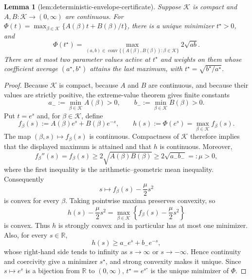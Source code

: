 \documentclass{article}
\newtheorem{lemma}{Lemma}
\begin{document}
\begin{lemma}[lem:deterministic-envelope-certificate]\label{lem:deterministic-envelope-certificate}
Suppose \(\mathcal K\) is compact and \(A,B:\mathcal K\to(0,\infty)\) are continuous.  For \(\Phi(t)=\max_{\beta\in\mathcal K}\{A(\beta)t+B(\beta)/t\}\), there is a unique minimizer \(t^{\star}>0\), and
\[
 \Phi(t^{\star})
 =\max_{(a,b)\in\operatorname{conv}\{(A(\beta),B(\beta)):\beta\in\mathcal K\}}2\sqrt{ab}.
\]
There are at most two parameter values active at \(t^{\star}\) and weights on them whose coefficient average \((a^{\star},b^{\star})\) attains the last maximum, with \(t^{\star}=\sqrt{b^{\star}/a^{\star}}\).
\end{lemma}
\begin{proof}
Because \(\mathcal K\) is compact, because \(A\) and \(B\) are continuous, and because their values are strictly positive, the extreme-value theorem gives finite constants
\[
 a_-:=\min_{\beta\in\mathcal K}A(\beta)>0,
 \qquad
 b_-:=\min_{\beta\in\mathcal K}B(\beta)>0.
\]
Put \(t=e^s\) and, for \(\beta\in\mathcal K\), define
\[
 f_\beta(s):=A(\beta)e^s+B(\beta)e^{-s},
 \qquad
 h(s):=\Phi(e^s)=\max_{\beta\in\mathcal K}f_\beta(s).
\]
The map \((\beta,s)\mapsto f_\beta(s)\) is continuous.  Compactness of \(\mathcal K\) therefore implies that the displayed maximum is attained and that \(h\) is continuous.  Moreover,
\[
 f_\beta''(s)=f_\beta(s)
 \ge 2\sqrt{A(\beta)B(\beta)}
 \ge 2\sqrt{a_-b_-}=:\mu>0,
\]
where the first inequality is the arithmetic--geometric mean inequality.  Consequently
\[
 s\longmapsto f_\beta(s)-\frac{\mu}{2}s^2
\]
is convex for every \(\beta\).  Taking pointwise maxima preserves convexity, so
\[
 h(s)-\frac{\mu}{2}s^2
 =\max_{\beta\in\mathcal K}
 \left\{f_\beta(s)-\frac{\mu}{2}s^2\right\}
\]
is convex.  Thus \(h\) is strongly convex and in particular has at most one minimizer.  Also, for every \(s\in\mathbb R\),
\[
 h(s)\ge a_-e^s+b_-e^{-s},
\]
whose right-hand side tends to infinity as \(s\to\infty\) or \(s\to-\infty\).  Hence continuity and coercivity give a minimizer \(s^\star\), and strong convexity makes it unique.  Since \(s\mapsto e^s\) is a bijection from \(\mathbb R\) to \((0,\infty)\), \(t^\star=e^{s^\star}\) is the unique minimizer of \(\Phi\).


\end{proof}
\end{document}
